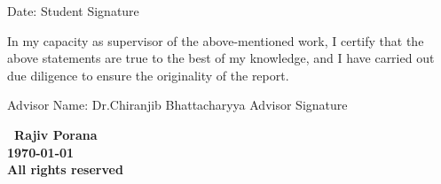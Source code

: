 \documentclass[oneside, 12pt]{IIScthesisPSnPDF}
\newcommand{\blankpage}{
\newpage
\thispagestyle{empty}
\mbox{}
\newpage
}
\begin{document}
	\vspace{20mm}

	\noindent
	{\footnotesize{Date: \hfill Student Signature}} \qquad

	\vspace{20mm}

	\noindent
	In my capacity as supervisor of the above-mentioned work, I certify that the
	above statements are true to the best of my knowledge, and I have carried out
	due diligence to ensure the originality of the report.

	\vspace{20mm}

	\noindent
	{\footnotesize{Advisor Name: Dr.Chiranjib Bhattacharyya \hfill Advisor Signature}}
	\qquad

	\blankpage

	\vspace*{\fill}
	\begin{center}
		\large\bf \textcopyright \ Rajiv Porana\\
		\large\bf \monthyeardate\today\\
		\large\bf All rights reserved
	\end{center}
	\vspace*{\fill}
	\thispagestyle{empty}




\end{document}
